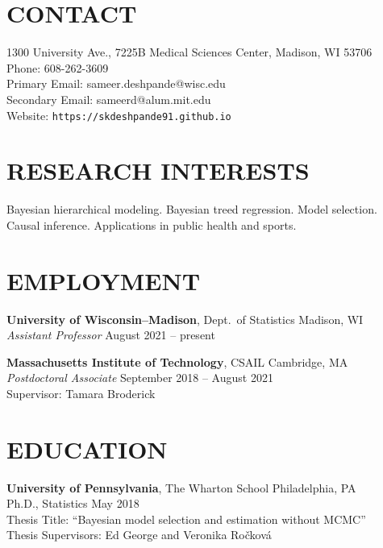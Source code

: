 \documentclass[margin]{res}
\begin{document}
  
                        
\begin{resume}                        
  
  \section{CONTACT} 
  1300 University Ave., 7225B Medical Sciences Center, Madison, WI 53706 \\
  Phone: 608-262-3609 \\ 
  Primary Email: sameer.deshpande@wisc.edu \\
  Secondary Email: sameerd@alum.mit.edu \\
  Website: \texttt{https://skdeshpande91.github.io}

  \section{RESEARCH INTERESTS}
  Bayesian hierarchical modeling. Bayesian treed regression. Model selection. Causal inference. Applications in public health and sports. 
              
\section{EMPLOYMENT} 

\textbf{University of Wisconsin--Madison}, Dept.~of Statistics \hfill Madison, WI \\
\textit{Assistant Professor} \hfill August 2021 -- present

\textbf{Massachusetts Institute of Technology}, CSAIL \hfill Cambridge, MA \\
\emph{Postdoctoral Associate} \hfill September 2018 -- August 2021 \\
Supervisor: Tamara Broderick
              
\section{EDUCATION}      
                {\bf University of Pennsylvania}, The Wharton School \hfill Philadelphia, PA \\
                Ph.D., Statistics \hfill May 2018 \\
		Thesis Title: ``Bayesian model selection and estimation without MCMC'' \\
		Thesis Supervisors: Ed George and Veronika Ro\v{c}kov\'{a}
                

\end{resume}
\end{document}
